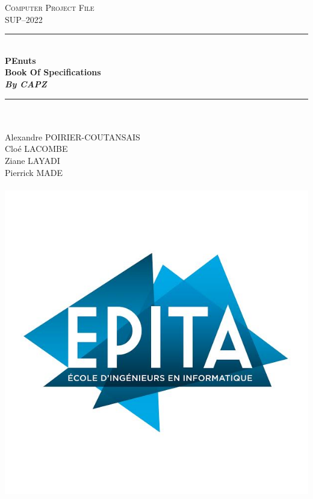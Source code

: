 \documentclass[12pt]{article}
\begin{document}
\begin{titlepage}
\newcommand{\HRule}{\rule{\linewidth}{0.4mm}} %

\center
\textsc{\Large Computer Project File}\\[0.1cm]
\textsc{\large SUP\---2022}\\[0.5cm]

\HRule \\
{ \huge \bfseries {PEnuts} \\
\LARGE Book Of Specifications \\[0.2cm]
\emph{\large{By CAPZ}}
}\\[0.2cm]
\HRule \\

\flushleft \Large \emph{}\\ 
  Alexandre POIRIER-COUTANSAIS\\
  Cloé LACOMBE\\
  Ziane LAYADI\\
  Pierrick MADE\\ 

\\[0cm] 

\includegraphics[scale = 0.28]{Logo_EPITA.jpg}\\[1cm]


\end{titlepage}
\end{document}
